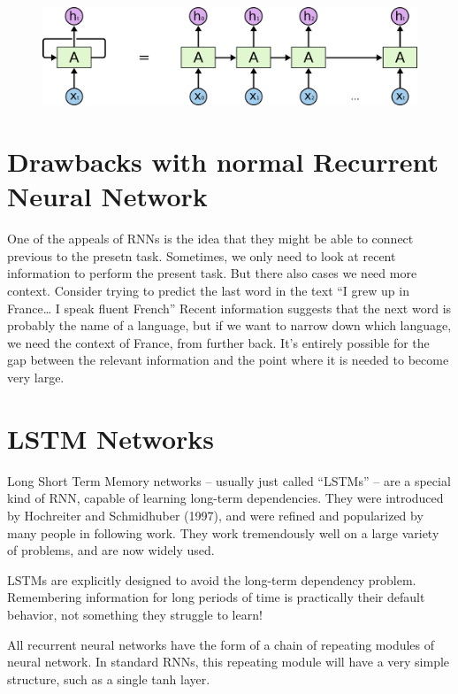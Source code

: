 \documentclass[BTech]{srmuthesis}
\begin{document}
\begin{figure}[h]
\includegraphics[scale=0.4]{RNN-unrolled.png}
\centering
\end{figure}

\section{Drawbacks with normal Recurrent Neural Network}

One of the appeals of RNNs is the idea that they might be able to connect previous to the presetn task. Sometimes, we only need to look at recent information to perform the present task. But there also cases we need more context. Consider trying to predict the last word in the text “I grew up in France… I speak fluent French” Recent information suggests that the next word is probably the name of a language, but if we want to narrow down which language, we need the context of France, from further back. It’s entirely possible for the gap between the relevant information and the point where it is needed to become very large.

\section{LSTM Networks}

Long Short Term Memory networks – usually just called “LSTMs” – are a special kind of RNN, capable of learning long-term dependencies. They were introduced by Hochreiter and Schmidhuber (1997), and were refined and popularized by many people in following work. They work tremendously well on a large variety of problems, and are now widely used.

LSTMs are explicitly designed to avoid the long-term dependency problem. Remembering information for long periods of time is practically their default behavior, not something they struggle to learn!

All recurrent neural networks have the form of a chain of repeating modules of neural network. In standard RNNs, this repeating module will have a very simple structure, such as a single tanh layer.
\end{document}
